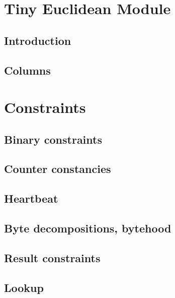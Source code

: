 \section{Tiny Euclidean Module}
\subsection{Introduction}                                          \label{euc: intro}                    
\subsection{Columns}                                               \label{euc: columns}                  

\section{Constraints}
\subsection{Binary constraints}                                    \label{euc: binary}                   
\subsection{Counter constancies}                                   \label{euc: counter constancies}      
\subsection{Heartbeat}                                             \label{euc: heartbeat}                
\subsection{Byte decompositions, bytehood}                         \label{euc: byteDec and bytehood}     
\subsection{Result constraints}                                    \label{euc: result constraints}       
\subsection{Lookup}                                                \label{euc: lookup}                   

